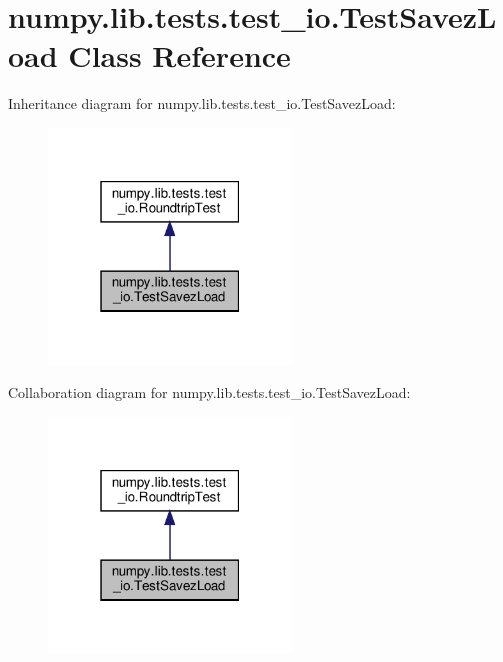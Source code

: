 \hypertarget{classnumpy_1_1lib_1_1tests_1_1test__io_1_1TestSavezLoad}{}\section{numpy.\+lib.\+tests.\+test\+\_\+io.\+Test\+Savez\+Load Class Reference}
\label{classnumpy_1_1lib_1_1tests_1_1test__io_1_1TestSavezLoad}


Inheritance diagram for numpy.\+lib.\+tests.\+test\+\_\+io.\+Test\+Savez\+Load\+:
\nopagebreak
\begin{figure}[H]
\begin{center}
\leavevmode
\includegraphics[width=183pt]{classnumpy_1_1lib_1_1tests_1_1test__io_1_1TestSavezLoad__inherit__graph}
\end{center}
\end{figure}


Collaboration diagram for numpy.\+lib.\+tests.\+test\+\_\+io.\+Test\+Savez\+Load\+:
\nopagebreak
\begin{figure}[H]
\begin{center}
\leavevmode
\includegraphics[width=183pt]{classnumpy_1_1lib_1_1tests_1_1test__io_1_1TestSavezLoad__coll__graph}
\end{center}
\end{figure}
